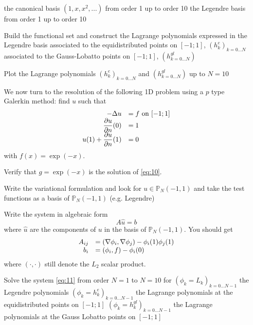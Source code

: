 \documentclass{article}
\begin{document}
\begin{Exercise}[title={p type Galerkin method in 1D}]
  \subQuestion the canonical basis $(1, x, x^2, ...)$ from order 1 up to order 10
  \subQuestion the Legendre basis from order 1 up to order 10

  \Question Build the functional set and construct the Lagrange polynomials expressed in the Legendre basis
  \subQuestion associated to the equidistributed points on $[-1;1]$, $(h^e_k)_{k=0...N}$
  \subQuestion associated to the Gauss-Lobatto points on $[-1;1]$, $(h^{gl}_{k=0...N})$



  \Question Plot the Lagrange polynomials $(h^e_k)_{k=0...N}$ and $(h^{gl}_{k=0...N})$ up to $N=10$

  \ExePart
  We now turn to the resolution of the following 1D problem using a $p$ type Galerkin method: find $u$ such that
  \begin{equation}
    \label{eq:10}
    \begin{array}[c]{rl}
      -\Delta u &= f \text{ on } [-1;1]\\
      \displaystyle \frac{\partial u}{\partial n}(0) &= 1\\
      \displaystyle u(1) + \frac{\partial u}{\partial n}(1) &= 0\\
    \end{array}
  \end{equation}
  with $f(x)=\exp(-x)$.

  \Question Verify that $g=\exp(-x)$ is the solution  of \eqref{eq:10}.

  \Question Write the variational formulation and look for $u \in
  \mathbb{P}_N(-1,1)$ and take the test functions as a basis of
  $\mathbb{P}_N(-1,1)$ (e.g. Legendre)

  \Question Write the system in algebraic form
  \begin{equation}
    \label{eq:11}
    A \hat{u} = b
  \end{equation}
  where $\hat{u}$ are the components of $u$ in the basis of
  $\mathbb{P}_N(-1,1)$.
  You should get
  \begin{equation}
    \label{eq:12}
    \begin{array}[c]{rl}
      A_{ij} &= (\nabla \phi_i, \nabla \phi_j) - \phi_i(1)\phi_j(1)\\
      b_i &= (\phi_i,f) - \phi_i(0)
    \end{array}
  \end{equation}
  where $(\cdot,\cdot)$ still denote the $L_2$ scalar product.

  \Question Solve the system \eqref{eq:11} from order $N=1$ to $N=10$ for
  \subQuestion $(\phi_k = L_k)_{k=0...N-1}$ the Legendre polynomials
  \subQuestion $(\phi_k = h^{e}_k)_{k=0...N-1}$ the Lagrange polynomials at the equidistributed points on $[-1;1]$
  \subQuestion $(\phi_k = h^{gl}_k)_{k=0...N-1}$ the Lagrange polynomials at the Gauss Lobatto points on $[-1;1]$


\end{Exercise}
\end{document}
